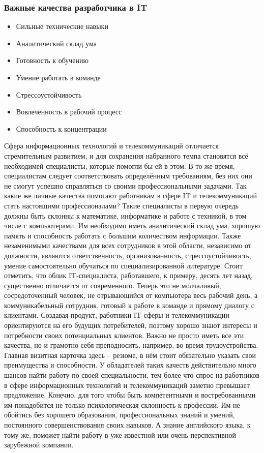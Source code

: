 \documentclass{../industrial-development}
\begin{document}
\begin{frame} \frametitle{Важные качества разработчика в IT}
	 \begin{itemize}
	 	\item Сильные технические навыки
		\item Аналитический склад ума
	 	\item Готовность к обучению
	 	\item Умение работать в команде
		\item Стрессоустойчивость
		\item Вовлеченность в рабочий процесс
		\item Способность к концентрации
	 \end{itemize}
\end{frame}
\lecturenotes
Сфера информационных технологий и телекоммуникаций отличается стремительным развитием, и для сохранения набранного темпа становятся всё необходимей специалисты, которые помогли бы ей в этом. В то же время, специалистам следует соответствовать определённым требованиям, без них они не смогут успешно справляться со своими профессиональными задачами. Так какие же личные качества помогают работникам в сфере IT и телекоммуникаций стать настоящими профессионалами?
Такие специалисты в первую очередь должны быть склонны к математике, информатике и работе с техникой, в том числе с компьютерами. Им необходимо иметь аналитический склад ума, хорошую память и способность работать с большим количеством информации. Также незаменимыми качествами для всех сотрудников в этой области, независимо от должности, являются ответственность, организованность, стрессоустойчивость, умение самостоятельно обучаться по специализированной литературе.
Стоит отметить, что облик IT-специалиста, работавшего, к примеру, десять лет назад, существенно отличается от современного. Теперь это не молчаливый, сосредоточенный человек, не отрывающийся от компьютера весь рабочий день, а коммуникабельный сотрудник, готовый к работе в команде и прямому диалогу с клиентами. Создавая продукт, работники IT-сферы и телекоммуникации ориентируются на его будущих потребителей, поэтому хорошо знают интересы и потребности своих потенциальных клиентов.
Важно не просто иметь все эти качества, но и грамотно себя преподносить, например, во время трудоустройства. Главная визитная карточка здесь – резюме, в нём стоит обязательно указать свои преимущества и способности. 
У обладателей таких качеств действительно много шансов найти работу по своей специальности, тем более что спрос на работников в сфере информационных технологий и телекоммуникаций заметно превышает предложение. Конечно, для того чтобы быть компетентными и востребованными им понадобится не только психологическая склонность к профессии. Им не обойтись без хорошего образования, профессиональных знаний и умений, постоянного совершенствования своих навыков. А знание английского языка, к тому же, поможет найти работу в уже известной или очень перспективной зарубежной компании.
~\cite{How_to_be_a_good_IT-manager}
\end{document}
